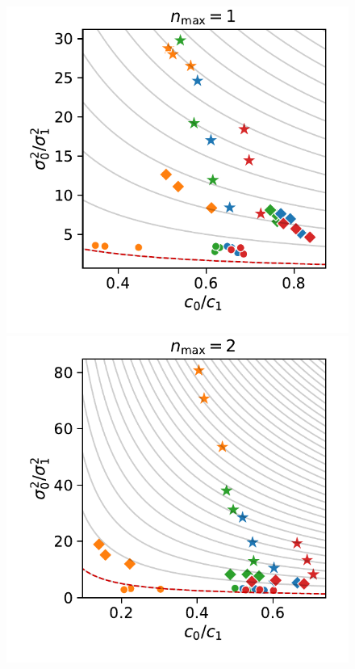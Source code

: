 \begin{figure}[tb]
  \centering
  \hfill
  \begin{minipage}{\textwidth}
    \includegraphics[scale=.5]{gfx/eff_landscape_order1.pdf}
    \includegraphics[scale=.5]{gfx/eff_landscape_order2.pdf}
  \end{minipage}

\end{figure}
